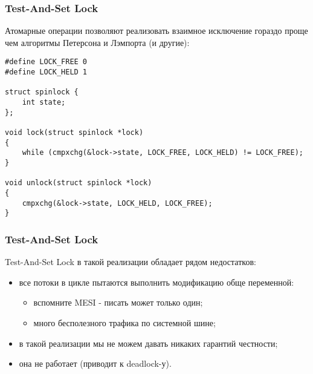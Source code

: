 \begin{frame}[fragile]
\frametitle{Test-And-Set Lock}

Атомарные операции позволяют реализовать взаимное исключение гораздо проще чем
алгоритмы Петерсона и Лэмпорта (и другие):

\begin{lstlisting}
#define LOCK_FREE 0
#define LOCK_HELD 1

struct spinlock {
    int state;
};

void lock(struct spinlock *lock)
{
    while (cmpxchg(&lock->state, LOCK_FREE, LOCK_HELD) != LOCK_FREE);
}

void unlock(struct spinlock *lock)
{
    cmpxchg(&lock->state, LOCK_HELD, LOCK_FREE);
}
\end{lstlisting}
\end{frame}

\begin{frame}
\frametitle{Test-And-Set Lock}

Test-And-Set Lock в такой реализации обладает рядом недостатков:
\begin{itemize}
  \item<2-> все потоки в цикле пытаются выполнить модификацию обще переменной:
        \begin{itemize}
          \item вспомните MESI - писать может только один;
          \item много бесполезного трафика по системной шине;
        \end{itemize}
  \item<3-> в такой реализации мы не можем давать никаких гарантий честности;
  \item<4-> она не работает (приводит к deadlock-у).
\end{itemize}
\end{frame}

